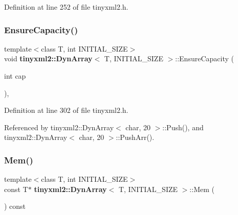 Definition at line 252 of file tinyxml2.\+h.

\mbox{\label{classtinyxml2_1_1_dyn_array_a30f2dec82744b45667452e6ce3d51e32}} 
\subsubsection{EnsureCapacity()}
{\footnotesize\ttfamily template$<$class T, int I\+N\+I\+T\+I\+A\+L\+\_\+\+S\+I\+ZE$>$ \\
void \textbf{ tinyxml2\+::\+Dyn\+Array}$<$ T, I\+N\+I\+T\+I\+A\+L\+\_\+\+S\+I\+ZE $>$\+::Ensure\+Capacity (\begin{DoxyParamCaption}\item[{int}]{cap }\end{DoxyParamCaption})\hspace{0.3cm}{\ttfamily [inline]}, {\ttfamily [private]}}



Definition at line 302 of file tinyxml2.\+h.



Referenced by tinyxml2\+::\+Dyn\+Array$<$ char, 20 $>$\+::\+Push(), and tinyxml2\+::\+Dyn\+Array$<$ char, 20 $>$\+::\+Push\+Arr().

\mbox{\label{classtinyxml2_1_1_dyn_array_a60b33e61cf10b3fd900ee46692dc0fe9}} 
\subsubsection{Mem()\hspace{0.1cm}{\footnotesize\ttfamily [1/2]}}
{\footnotesize\ttfamily template$<$class T, int I\+N\+I\+T\+I\+A\+L\+\_\+\+S\+I\+ZE$>$ \\
const T$\ast$ \textbf{ tinyxml2\+::\+Dyn\+Array}$<$ T, I\+N\+I\+T\+I\+A\+L\+\_\+\+S\+I\+ZE $>$\+::Mem (\begin{DoxyParamCaption}{ }\end{DoxyParamCaption}) const\hspace{0.3cm}{\ttfamily [inline]}}



